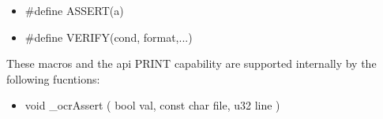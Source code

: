 \begin{itemize}

\item \#define ASSERT(a)

\item  \#define VERIFY(cond, format,...)

\end{itemize}

These macros and the api PRINT capability are supported internally by the following fucntions:

\begin{itemize}

\item void \_ocrAssert ( bool val, const char  file, u32 line )

\end{itemize}


